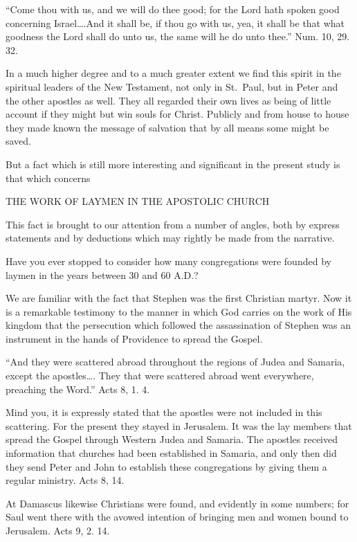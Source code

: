 \documentclass[
]{book}
\begin{document}
``Come thou with us, and we will do thee good; for the Lord hath spoken good concerning Israel\ldots.And it shall be, if thou go with us, yea, it shall be that what goodness the Lord shall do unto us, the same will he do unto thee.'' Num. 10, 29. 32.

In a much higher degree and to a much greater extent we find this spirit in the spiritual leaders of the New Testament, not only in St.~Paul, but in Peter and the other apostles as well. They all regarded their own lives as being of little account if they might but win souls for Christ. Publicly and from house to house they made known the message of salvation that by all means some might be saved.

But a fact which is still more interesting and significant in the present study is that which concerns

\begin{center} THE WORK OF LAYMEN IN THE APOSTOLIC CHURCH \end{center}

This fact is brought to our attention from a number of angles, both by express statements and by deductions which may rightly be made from the narrative.

Have you ever stopped to consider how many congregations were founded by laymen in the years between 30 and 60 A.D.?

We are familiar with the fact that Stephen was the first Christian martyr. Now it is a remarkable testimony to the manner in which God carries on the work of His kingdom that the persecution which followed the assassination of Stephen was an instrument in the hands of Providence to spread the Gospel.

``And they were scattered abroad throughout the regions of Judea and Samaria, except the apostles\ldots. They that were scattered abroad went everywhere, preaching the Word.'' Acts 8, 1. 4.

Mind you, it is expressly stated that the apostles were not included in this scattering. For the present they stayed in Jerusalem. It was the lay members that spread the Gospel through Western Judea and Samaria. The apostles received information that churches had been established in Samaria, and only then did they send Peter and John to establish these congregations by giving them a regular ministry. Acts 8, 14.

At Damascus likewise Christians were found, and evidently in some numbers; for Saul went there with the avowed intention of bringing men and women bound to Jerusalem. Acts 9, 2. 14.
\end{document}

